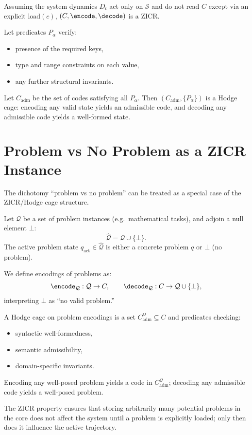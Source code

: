 \documentclass[11pt]{article}
\theoremstyle{definition}
\begin{document}
Assuming the system dynamics $D_t$ act only on $\mathcal{S}$ and do not read $C$ except via an explicit $\mathrm{load}(c)$, $(C,\encode,\decode)$ is a ZICR.

Let predicates $P_\alpha$ verify:
\begin{itemize}
  \item presence of the required keys,
  \item type and range constraints on each value,
  \item any further structural invariants.
\end{itemize}
Let $C_{\mathrm{adm}}$ be the set of codes satisfying all $P_\alpha$.
Then $(C_{\mathrm{adm}},\{P_\alpha\})$ is a Hodge cage:
encoding any valid state yields an admissible code, and decoding any admissible code yields a well-formed state.

\section{Problem vs No Problem as a ZICR Instance}

The dichotomy ``problem vs no problem'' can be treated as a special case of the ZICR/Hodge cage structure.

Let $\mathcal{Q}$ be a set of problem instances (e.g.\ mathematical tasks), and adjoin a null element $\bot$:
\[
\hat{\mathcal{Q}} = \mathcal{Q} \cup \{\bot\}.
\]
The active problem state $q_{\mathrm{act}} \in \hat{\mathcal{Q}}$ is either a concrete problem $q$ or $\bot$ (no problem).

We define encodings of problems as:
\[
\encode_{\mathcal{Q}}: \mathcal{Q} \to C,\qquad
\decode_{\mathcal{Q}}: C \to \mathcal{Q} \cup \{\bot\},
\]
interpreting $\bot$ as ``no valid problem.''

A Hodge cage on problem encodings is a set $C_{\mathrm{adm}}^{\mathcal{Q}}\subseteq C$ and predicates checking:
\begin{itemize}
  \item syntactic well-formedness,
  \item semantic admissibility,
  \item domain-specific invariants.
\end{itemize}
Encoding any well-posed problem yields a code in $C_{\mathrm{adm}}^{\mathcal{Q}}$; decoding any admissible code yields a well-posed problem.

The ZICR property ensures that storing arbitrarily many potential problems in the core does not affect the system until a problem is explicitly loaded; only then does it influence the active trajectory.
\end{document}
